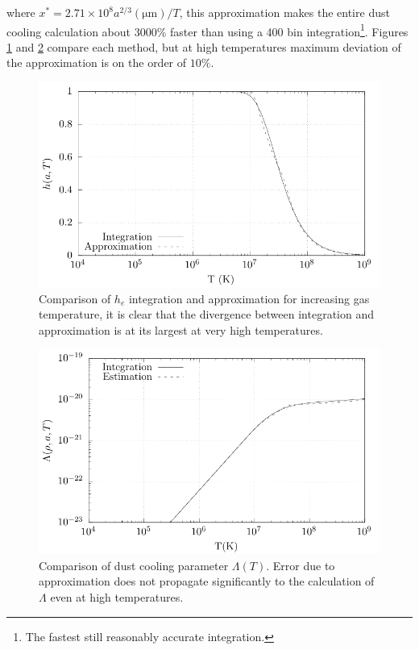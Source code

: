 where $x^* = 2.71\times 10^8 a^{2/3} (\si{\micro\metre})/T$, this approximation makes the entire dust cooling calculation about 3000\% faster than using a 400 bin integration\footnote{The fastest still reasonably accurate integration.}. Figures \ref{fig:hecomparison} and \ref{fig:lambdacomparison} compare each method, but at high temperatures maximum deviation of the approximation is on the order of $10\%$.

\begin{figure}[ht]
  \centering
  \includegraphics{assets/xe/temp.pdf}
  \caption[Comparison of $h_e$ integration and approximation for increasing gas temperature]{Comparison of $h_e$ integration and approximation for increasing gas temperature, it is clear that the divergence between integration and approximation is at its largest at very high temperatures.}
  \label{fig:hecomparison}
\end{figure}

\begin{figure}[ht]
  \centering
  \includegraphics{assets/dustcooling/lambda-comp.pdf}
  \caption[Comparison of dust cooling parameter $\Lambda$(T)]{Comparison of dust cooling parameter $\Lambda(T)$. Error due to approximation does not propagate significantly to the calculation of $\Lambda$ even at high temperatures.}
  \label{fig:lambdacomparison}
\end{figure}



